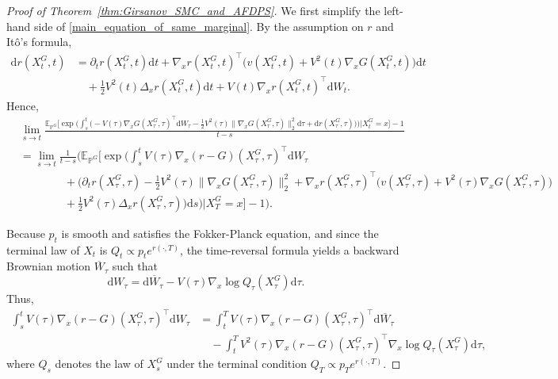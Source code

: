 \documentclass{article}
\theoremstyle{plain}
\theoremstyle{definition}
\theoremstyle{remark}
\newcommand{\dif}{{\mathrm{d}}}
\renewcommand{\P}{{\mathbb{P}}}
\begin{document}
\begin{proof}[Proof of Theorem~\ref{thm:Girsanov_SMC_and_AFDPS}]
We first simplify the left-hand side of \eqref{main_equation_of_same_marginal}. 
By the assumption on \(r\) and It\^o's formula,
\begin{align*}
\dif r(X_t^G,t)
&= \partial_t r(X_t^G,t)\dif t+\nabla_x r(X_t^G,t)^{\top}\big(v(X_t^G,t)+V^2(t)\nabla_x G(X_t^G,t)\big)\dif t\\
&\quad + \frac12 V^2(t)\Delta_x r(X_t^G,t)\dif t
+ V(t)\nabla_x r(X_t^G,t)^{\top} \dif W_t.
\end{align*}
Hence,
\begin{align}
&\lim_{s\to t}\frac{\mathbb{E}_{\P^G}\Bigg[\exp\bigg(\displaystyle\int_s^t\bigg(-V(\tau)\nabla_x G(X_\tau^G,\tau)^{\top} \dif W_\tau 
-\frac12 V^2(\tau)\|\nabla_x G(X_\tau^G,\tau)\|_2^2 \dif \tau
+ \dif r(X_\tau^G,\tau)\bigg)\bigg)\bigg|X_t^G=x\Bigg]-1}{t-s}\nonumber\\
&=\lim_{s\to t}\frac{1}{t-s}\Bigg(
\mathbb{E}_{\P^G}\Bigg[\exp\bigg(\int_s^t V(\tau)\nabla_x (r-G)(X_\tau^G,\tau)^{\top} \dif W_\tau \nonumber\\
&\qquad\qquad+\bigg(\partial_t r(X_\tau^G,\tau)-\frac12 V^2(\tau)\|\nabla_x G(X_\tau^G,\tau)\|^2_2
+\nabla_x r(X_\tau^G,\tau)^{\top}\big(v(X_\tau^G,\tau)+V^2(\tau)\nabla_x G(X_\tau^G,\tau)\big)\nonumber\\
&\qquad\qquad+\frac12 V^2(\tau)\Delta_x r(X_\tau^G,\tau)\bigg)\dif s\bigg)\bigg|X_T^G=x\Bigg]-1\Bigg).
\label{simplification_of_LHS}
\end{align}

Because \(p_t\) is smooth and satisfies the Fokker-Planck equation, and since the terminal law of \(X_t\) is \(Q_t\propto p_t e^{r(\cdot, T)}\), the time-reversal formula yields a backward Brownian motion \(\overline W_\tau\) such that
\[
\dif W_\tau = \dif \overline W_\tau - V(\tau)\nabla_x\log Q_\tau(X_\tau^G) \dif \tau.
\]
Thus,
\begin{align}
\int_s^t V(\tau)\nabla_x (r-G)(X_\tau^G,\tau)^{\top} \dif W_\tau
&= \int_t^T V(\tau)\nabla_x (r-G)(X_\tau^G,\tau)^{\top} \dif \overline W_\tau\\
 &\quad- \int_t^T V^2(\tau)\nabla_x (r-G)(X_\tau^G,\tau)^{\top}\nabla_x\log Q_\tau(X_\tau^G)\dif \tau,
\end{align}
where \(Q_s\) denotes the law of \(X_s^G\) under the terminal condition \(Q_T\propto p_T e^{r(\cdot, T)}\).


\end{proof}
\end{document}
